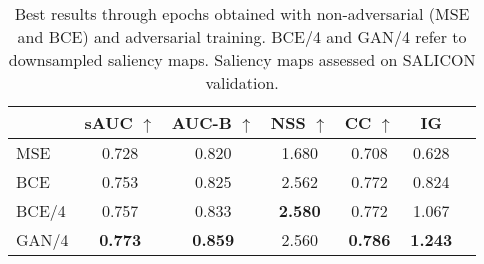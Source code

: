 \documentclass[times,twocolumn,final,authoryear]{elsarticle}
\begin{document}
\begin{table}
\begin{center}
\begin{tabular}{lcccccc}
\hline
			& sAUC $\uparrow$ 	& AUC-B $\uparrow$		& NSS $\uparrow$ 	& CC $\uparrow$ 	& IG \\
\hline
MSE			& 0.728			& 0.820				& 1.680			& 0.708 			& 0.628 \\
BCE			& 0.753			& 0.825				& 2.562			& 0.772 			& 0.824 \\
\hline
BCE/4		& 0.757			& 0.833				& \textbf{2.580}	& 0.772 			& 1.067\\
GAN/4		& \textbf{0.773}	& \textbf{0.859}		& 2.560			& \textbf{0.786} 	& \textbf{1.243}\\

\hline
\end{tabular}
\end{center}
\caption{Best results through epochs obtained with non-adversarial (MSE and BCE) and adversarial training. BCE/4 and GAN/4 refer to downsampled saliency maps.  Saliency maps assessed on SALICON validation. }
\label{tab:Adversarial}
\end{table}



\end{document}

